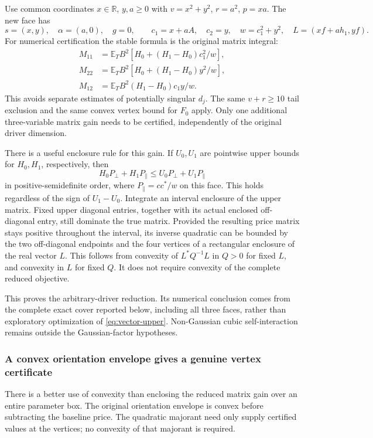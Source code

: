 Use common coordinates $x\in\mathbb R$, $y,a\ge0$ with
$v=x^2+y^2$, $r=a^2$, $p=xa$.  The new face has
\[
 s=(x,y),\quad\alpha=(a,0),\quad g=0,\qquad
 c_1=x+aA,\quad c_2=y,\quad w=c_1^2+y^2,
 \quad L=(xf+ah_1,yf).
\]
For numerical certification the stable formula is the original matrix
integral:
\begin{align*}
 M_{11}&=\mathbb E_T B^2\left[H_0+(H_1-H_0)c_1^2/w\right],\\
 M_{22}&=\mathbb E_T B^2\left[H_0+(H_1-H_0)y^2/w\right],\\
 M_{12}&=\mathbb E_T B^2(H_1-H_0)c_1y/w.
\end{align*}
This avoids separate estimates of potentially singular $d_j$.
The same $v+r\ge10$ tail exclusion and the same convex vertex bound for
$F_0$ apply.  Only one additional three-variable matrix gain needs to be
certified, independently of the original driver dimension.

There is a useful enclosure rule for this gain.  If $U_0,U_1$ are
pointwise upper bounds for $H_0,H_1$, respectively, then
\[
 H_0P_\perp+H_1P_\parallel
 \le U_0P_\perp+U_1P_\parallel
\]
in positive-semidefinite order, where
$P_\parallel=cc^*/w$ on this face.  This holds regardless of the sign of
$U_1-U_0$.  Integrate an interval enclosure of the upper matrix.  Fixed
upper diagonal entries, together with its actual enclosed off-diagonal
entry, still dominate the true matrix.  Provided the resulting price
matrix stays positive throughout the interval, its inverse quadratic can
be bounded by the two off-diagonal endpoints and the four vertices of a
rectangular enclosure of the real vector $L$.  This follows from convexity
of $L^*Q^{-1}L$ in $Q>0$ for fixed $L$, and convexity in $L$ for fixed $Q$.
It does not require convexity of the complete reduced objective.

This proves the arbitrary-driver reduction.  Its numerical conclusion
comes from the complete exact cover reported below, including all three
faces, rather than exploratory optimization of \eqref{eq:vector-upper}.
Non-Gaussian cubic self-interaction remains outside the Gaussian-factor
hypotheses.

\subsubsection{A convex orientation envelope gives a genuine vertex certificate}
\label{sec:convex-orientation-envelope}

There is a better use of convexity than enclosing the reduced matrix gain
over an entire parameter box.  The original orientation envelope is convex
before subtracting the baseline price.  The quadratic majorant need only
supply certified values at the vertices; no convexity of that majorant is
required.


